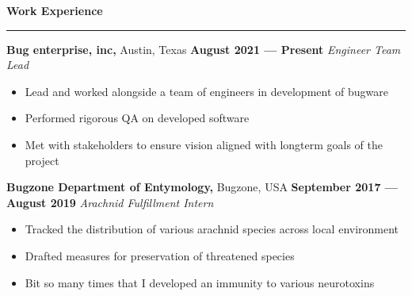 \documentclass[a4paper, 12pt]{article}
\begin{document}
\begin{flushleft}
             {\fontsize{12pt}{12pt}\selectfont \textbf{Work Experience}}
             \noindent\rule{\textwidth}{0.4pt}
\end{flushleft}
\begin{flushleft}
             {\textbf{Bug enterprise, inc,} Austin, Texas \hfill 
               \textbf{August 2021 --- Present}}
               \newline
               \textit{Engineer Team Lead}
               \begin{itemize}
               \item Lead and worked alongside a team of engineers in development of bugware
               \item Performed rigorous QA on developed software
               \item Met with stakeholders to ensure vision aligned with longterm goals of the project
               \end{itemize}
\end{flushleft}
\begin{flushleft}
             {\textbf{Bugzone Department of Entymology,} Bugzone, USA \hfill 
               \textbf{September 2017 --- August 2019}}
               \newline
               \textit{Arachnid Fulfillment Intern}
               \begin{itemize}
               \item Tracked the distribution of various arachnid species across local environment
               \item Drafted measures for preservation of threatened species
               \item Bit so many times that I developed an immunity to various neurotoxins
               \end{itemize}
\end{flushleft}
\end{document}
